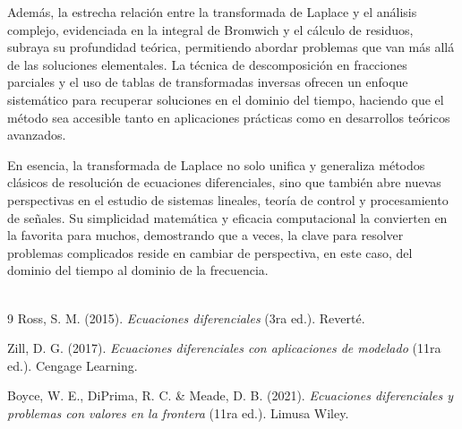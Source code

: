 \documentclass{article}
\theoremstyle{nonumberplain}
\begin{document}
Además, la estrecha relación entre la transformada de Laplace y el análisis complejo, evidenciada en la integral de Bromwich y el cálculo de residuos, subraya su profundidad teórica, permitiendo abordar problemas que van más allá de las soluciones elementales. La técnica de descomposición en fracciones parciales y el uso de tablas de transformadas inversas ofrecen un enfoque sistemático para recuperar soluciones en el dominio del tiempo, haciendo que el método sea accesible tanto en aplicaciones prácticas como en desarrollos teóricos avanzados.

En esencia, la transformada de Laplace no solo unifica y generaliza métodos clásicos de resolución de ecuaciones diferenciales, sino que también abre nuevas perspectivas en el estudio de sistemas lineales, teoría de control y procesamiento de señales. Su simplicidad matemática y eficacia computacional la convierten en la favorita para muchos, demostrando que a veces, la clave para resolver problemas complicados reside en cambiar de perspectiva, en este caso, del dominio del tiempo al dominio de la frecuencia. \\\\

\begin{thebibliography}{9}
Ross, S. M. (2015). \textit{Ecuaciones diferenciales} (3ra ed.). Reverté.

Zill, D. G. (2017). \textit{Ecuaciones diferenciales con aplicaciones de modelado} (11ra ed.). Cengage Learning.

Boyce, W. E., DiPrima, R. C. \& Meade, D. B. (2021). \textit{Ecuaciones diferenciales y problemas con valores en la frontera} (11ra ed.). Limusa Wiley.
\end{thebibliography}
\end{document}
